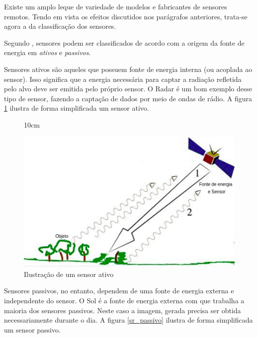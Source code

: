 Existe um amplo leque de variedade de modelos e fabricantes de sensores remotos. Tendo em vista os efeitos discutidos nos parágrafos anteriores, trata-se agora a da classificação dos sensores.

Segundo , sensores podem ser classificados de acordo com a origem da fonte de energia em  \textit{ativos} e \textit{passivos}.

Sensores ativos são aqueles que possuem fonte de energia interna (ou acoplada ao sensor). Isso significa que a energia necessária para captar a radiação refletida pelo alvo deve ser emitida pelo próprio sensor. O Radar é um bom exemplo desse tipo de sensor, fazendo a captação de dados por meio de ondas de rádio. A figura \ref{sr_ativo} ilustra de forma simplificada um sensor ativo.

\begin{figure}[!ht]{10cm}
  \caption{Ilustração de um sensor ativo} \label{sr_ativo}
  \includegraphics[width=1\hsize]{figuras/sensor_ativo.png}
\end{figure}

Sensores passivos, no entanto, dependem de uma fonte de energia externa e independente do sensor. O Sol é a fonte de energia externa com que trabalha a maioria dos sensores passivos. Neste caso a imagem, gerada precisa ser obtida necessariamente durante o dia. A figura \ref{sr_passivo} ilustra de forma simplificada um sensor passivo.

